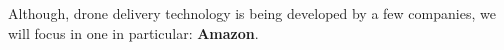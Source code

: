 \documentclass[conference]{IEEEtran}
\begin{document}
Although, drone delivery technology is being developed by a few companies, we will focus in one in particular: \textbf{Amazon}.\\


%
%



%
%
\end{document}
